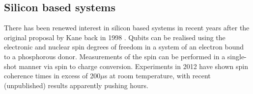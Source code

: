 \subsection{Silicon based systems}\label{silicon_based_systems}

There has been renewed interest in silicon based systems in recent years after the original proposal by Kane back in 1998 \cite{silicon_proposal_98}. Qubits can be realised using the electronic and nuclear spin degrees of freedom in a system of an electron bound to a phosphorous donor. Measurements of the spin can be performed in a single-shot manner via spin to charge conversion. Experiments in 2012 have shown spin coherence times in excess of 200$\mu$s \cite{silicon_qubit, silicon_seconds} at room temperature, with recent (unpublished) results apparently pushing hours.


